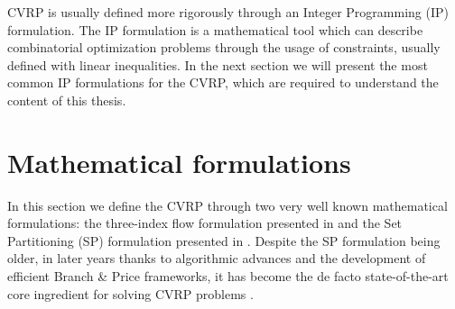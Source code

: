 CVRP is usually defined more rigorously through an Integer Programming (IP) formulation.
The IP formulation is a mathematical tool which can describe combinatorial optimization problems
through the usage of constraints, usually defined with linear inequalities.
In the next section we will present the most common IP formulations for the CVRP, which
are required to understand the content of this thesis.


\begin{comment}
\cite{toth2002}
The distribution of goods concerns the service, in a given time period, of a set of
customers by a set of vehicles, which are located in one or more depots, are operated by a
set of crews (drivers), and perform their movements by using an appropriate road network. In
particular, the solution of a VRP calls for the determination of a set of routes, each performed
by a single vehicle that starts and ends at its own depot, such that all the requirements
of the customers are fulfilled, all the operational constraints are satisfied, and the global
transportation cost is minimized. In this section, we describe the typical characteristics of
the routing and scheduling problems by considering their main components (road network,
customers, depots, vehicles, and drivers), the different operational constraints that can be
imposed on the construction of the routes, and the possible objectives to be achieved in the
optimization process.
The road network, used for the transportation of goods, is generally described through
a graph, whose arcs represent the road sections and whose vertices correspond to the road
junctions and to the depot and customer locations.
\end{comment}

\section{Mathematical formulations}
\label{sec:intro-cvrp-mathematical-formulations}


In this section we define the CVRP through two very well known mathematical formulations:
the three-index flow formulation presented in \textcite{toth2002} and
the Set Partitioning (SP) formulation presented in \textcite{balinski1964}.
Despite the SP formulation being older, in later years thanks to algorithmic advances
and the development of efficient Branch \& Price frameworks, it has become the de facto
state-of-the-art core ingredient for solving CVRP problems \parencite{pessoa2020}.

